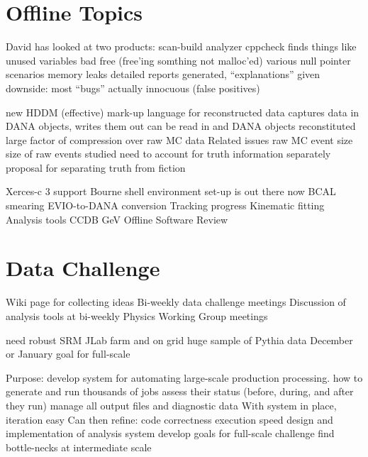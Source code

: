 

\section{Offline Topics}


\I David has looked at two products:
    \I scan-build analyzer
    \I cppcheck
\I finds things like
    \I unused variables
    \I bad free (free'ing somthing not malloc'ed)
    \I various null pointer scenarios
    \I memory leaks
\I detailed reports generated, ``explanations'' given
\I downside: most ``bugs'' actually innocuous (false positives)


\I new HDDM (effective) mark-up language for reconstructed data
\I captures data in DANA objects, writes them out
\I can be read in and DANA objects reconstituted
\I large factor of compression over raw MC data
\bc Related issues\ec
\I raw MC event size
    \I size of raw events studied
    \I need to account for truth information separately
\I proposal for separating truth from fiction


\I Xerces-c 3 support
\I Bourne shell environment set-up is out there now
\I BCAL smearing
\I EVIO-to-DANA conversion
\I Tracking progress
\I Kinematic fitting
\I Analysis tools
\I CCDB
 GeV Offline Software Review

\section{Data Challenge}


\I Wiki page for collecting ideas
\I Bi-weekly data challenge meetings
\I Discussion of analysis tools at bi-weekly Physics Working Group meetings

\I need robust SRM
\I JLab farm and on grid
\I huge sample of Pythia data
\I December or January goal for full-scale


\I Purpose: develop system for automating large-scale production processing.
    \I how to generate and run thousands of jobs
    \I assess their status (before, during, and after they run)
    \I manage all output files and diagnostic data
\I With system in place, iteration easy
\I Can then refine:
    \I code correctness
    \I execution speed
    \I design and implementation of analysis system
    \I develop goals for full-scale challenge
    \I find bottle-necks at intermediate scale 

